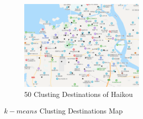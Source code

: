 \documentclass{llncs}
\begin{document}
\begin{figure}[htbp]
\begin{subfigure}[t]{0.45\textwidth}
		\begin{minipage}{6cm}
			\centering
			\includegraphics[width=6cm]{figures/haikou_50.png}
			\caption{50 Clusting Destinations of Haikou}
		\end{minipage}
	\end{subfigure}
	\caption{$k-means$ Clusting Destinations Map}
	\label{fig-k}
\end{figure}
\end{document}
